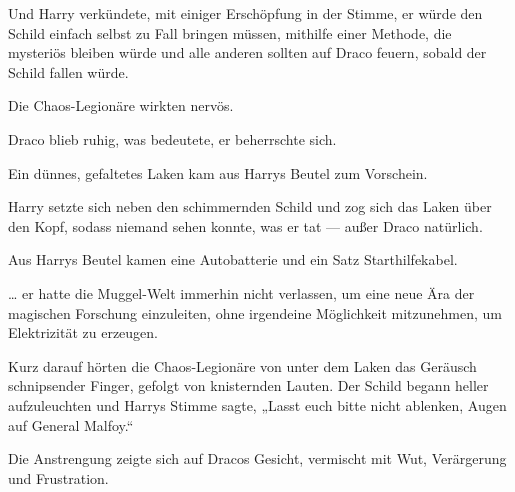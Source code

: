 Und Harry verkündete, mit einiger Erschöpfung in der Stimme, er würde den Schild einfach selbst zu Fall bringen müssen, mithilfe einer Methode, die mysteriös bleiben würde und alle anderen sollten auf Draco feuern, sobald der Schild fallen würde.

Die Chaos-Legionäre wirkten nervös.

Draco blieb ruhig, was bedeutete, er beherrschte sich.

Ein dünnes, gefaltetes Laken kam aus Harrys Beutel zum Vorschein.

Harry setzte sich neben den schimmernden Schild und zog sich das Laken über den Kopf, sodass niemand sehen konnte, was er tat — außer Draco natürlich.

Aus Harrys Beutel kamen eine Autobatterie und ein Satz Starthilfekabel.

… er hatte die Muggel-Welt immerhin nicht verlassen, um eine neue Ära der magischen Forschung einzuleiten, ohne irgendeine Möglichkeit mitzunehmen, um Elektrizität zu erzeugen.

Kurz darauf hörten die Chaos-Legionäre von unter dem Laken das Geräusch schnipsender Finger, gefolgt von knisternden Lauten. Der Schild begann heller aufzuleuchten und Harrys Stimme sagte,
„Lasst euch bitte nicht ablenken, Augen auf General Malfoy.“

Die Anstrengung zeigte sich auf Dracos Gesicht, vermischt mit Wut, Verärgerung und Frustration.

